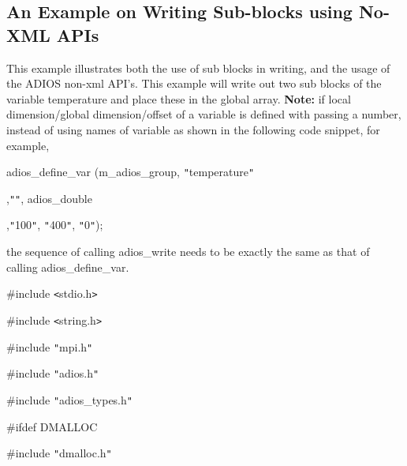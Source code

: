 \vspace{23pt}
\subsection{An Example on Writing Sub-blocks using No-XML APIs}

\vspace{10pt}
This example illustrates both the use of sub blocks in writing, and the usage of 
the ADIOS non-xml API's. This example will write out two sub blocks of the variable 
temperature and place these in the global array. \textbf{Note:} if local dimension/global 
dimension/offset of a variable is defined with passing a number, instead of using 
names of variable as shown in the following code snippet, for example,

\vspace{10pt}
adios\_define\_var (m\_adios\_group, \texttt{"}temperature\texttt{"}

\vspace{10pt}
\parindent=86pt
,\texttt{"}\texttt{"}, adios\_double

\vspace{10pt}
,\texttt{"}100\texttt{"}, \texttt{"}400\texttt{"}, \texttt{"}0\texttt{"});

\vspace{23pt}
\parindent=0pt
the sequence of calling adios\_write needs to be exactly the same as that of calling 
adios\_define\_var.

\vspace{10pt}
\#include \texttt{<}stdio.h\texttt{>}

\vspace{10pt}
\#include \texttt{<}string.h\texttt{>}

\vspace{10pt}
\#include \texttt{"}mpi.h\texttt{"}

\vspace{10pt}
\#include \texttt{"}adios.h\texttt{"}

\vspace{10pt}
\#include \texttt{"}adios\_types.h\texttt{"}

\vspace{23pt}
\#ifdef DMALLOC

\vspace{10pt}
\#include \texttt{"}dmalloc.h\texttt{"}

